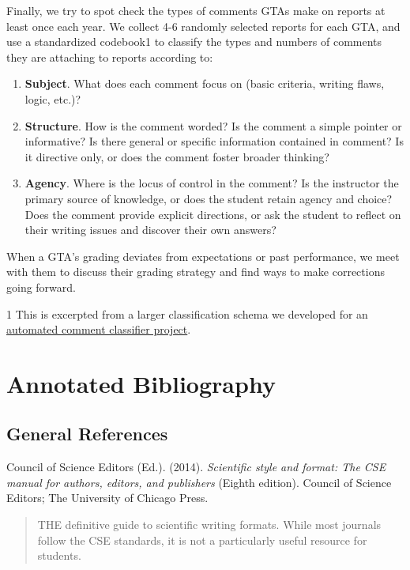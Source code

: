 \documentclass[
]{book}
\providecommand{\tightlist}{%
  \setlength{\itemsep}{0pt}\setlength{\parskip}{0pt}}
\begin{document}
Finally, we try to spot check the types of comments GTAs make on reports at least once each year. We collect 4-6 randomly selected reports for each GTA, and use a standardized codebook1 to classify the types and numbers of comments they are attaching to reports according to:

\begin{enumerate}
\def\labelenumi{\arabic{enumi}.}
\tightlist
\item
  \textbf{Subject}. What does each comment focus on (basic criteria, writing flaws, logic, etc.)?
\item
  \textbf{Structure}. How is the comment worded? Is the comment a simple pointer or informative? Is there general or specific information contained in comment? Is it directive only, or does the comment foster broader thinking?
\item
  \textbf{Agency}. Where is the locus of control in the comment? Is the instructor the primary source of knowledge, or does the student retain agency and choice? Does the comment provide explicit directions, or ask the student to reflect on their writing issues and discover their own answers?
\end{enumerate}

When a GTA's grading deviates from expectations or past performance, we meet with them to discuss their grading strategy and find ways to make corrections going forward.

1 This is excerpted from a larger classification schema we developed for an \href{https://adanieljohnson.github.io/default_website/codebook.html}{automated comment classifier project}.

\hypertarget{bibliography750}{%
\chapter{Annotated Bibliography}\label{bibliography750}}

\hypertarget{general-references}{%
\section{General References}\label{general-references}}

Council of Science Editors (Ed.). (2014). \emph{Scientific style and format: The CSE manual for authors, editors, and publishers} (Eighth edition). Council of Science Editors; The University of Chicago Press.

\begin{quote}
THE definitive guide to scientific writing formats. While most journals follow the CSE standards, it is not a particularly useful resource for students.
\end{quote}
\end{document}

